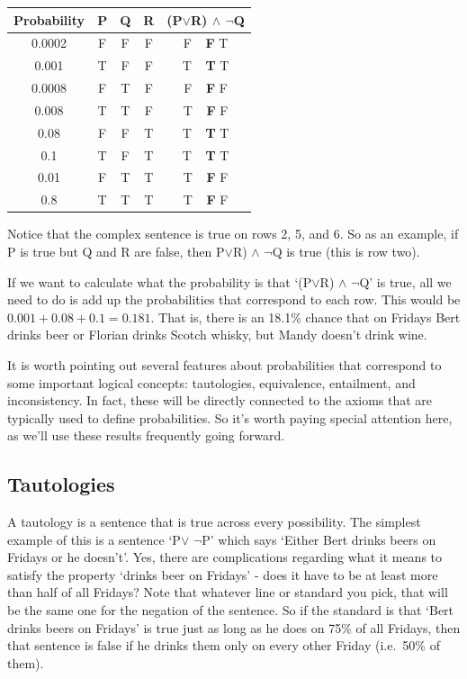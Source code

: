 \documentclass[]{tufte-book}
\begin{document}
\begin{longtable}[]{@{}ccccc@{}}
\toprule
Probability & P & Q & R & (P\(\vee\)R) \(\wedge\) \(\neg\)Q\tabularnewline
\midrule
\endhead
0.0002 & F & F & F & F \(~~\) \textbf{F} T\tabularnewline
0.001 & T & F & F & T \(~~\) \textbf{T} T\tabularnewline
0.0008 & F & T & F & F \(~~\) \textbf{F} F\tabularnewline
0.008 & T & T & F & T \(~~\) \textbf{F} F\tabularnewline
0.08 & F & F & T & T \(~~\) \textbf{T} T\tabularnewline
0.1 & T & F & T & T \(~~\) \textbf{T} T\tabularnewline
0.01 & F & T & T & T \(~~\) \textbf{F} F\tabularnewline
0.8 & T & T & T & T \(~~\) \textbf{F} F\tabularnewline
\bottomrule
\end{longtable}

Notice that the complex sentence is true on rows 2, 5, and 6. So as an example, if P is true but Q and R are false, then P\(\vee\)R) \(\wedge\) \(\neg\)Q is true (this is row two).

If we want to calculate what the probability is that `(P\(\vee\)R) \(\wedge\) \(\neg\)Q' is true, all we need to do is add up the probabilities that correspond to each row. This would be \(0.001+0.08+0.1 = 0.181\). That is, there is an 18.1\% chance that on Fridays Bert drinks beer or Florian drinks Scotch whisky, but Mandy doesn't drink wine.

It is worth pointing out several features about probabilities that correspond to some important logical concepts: tautologies, equivalence, entailment, and inconsistency. In fact, these will be directly connected to the axioms that are typically used to define probabilities. So it's worth paying special attention here, as we'll use these results frequently going forward.

\hypertarget{tautologies}{%
\subsection{Tautologies}\label{tautologies}}

A tautology is a sentence that is true across every possibility. The simplest example of this is a sentence `P\(\vee\) \(\neg\)P' which says `Either Bert drinks beers on Fridays or he doesn't'. Yes, there are complications regarding what it means to satisfy the property `drinks beer on Fridays' - does it have to be at least more than half of all Fridays? Note that whatever line or standard you pick, that will be the same one for the negation of the sentence. So if the standard is that `Bert drinks beers on Fridays' is true just as long as he does on 75\% of all Fridays, then that sentence is false if he drinks them only on every other Friday (i.e.~50\% of them).
\end{document}
